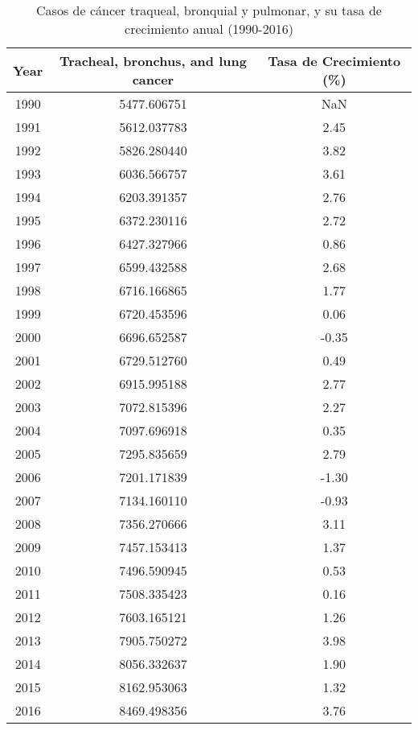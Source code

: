 \begin{table}[ht]
\centering
\begin{tabular}{|c|c|c|}
\hline
\textbf{Year} & \textbf{Tracheal, bronchus, and lung cancer} & \textbf{Tasa de Crecimiento (\%)} \\ \hline
1990 & 5477.606751 & NaN \\ \hline
1991 & 5612.037783 & 2.45 \\ \hline
1992 & 5826.280440 & 3.82 \\ \hline
1993 & 6036.566757 & 3.61 \\ \hline
1994 & 6203.391357 & 2.76 \\ \hline
1995 & 6372.230116 & 2.72 \\ \hline
1996 & 6427.327966 & 0.86 \\ \hline
1997 & 6599.432588 & 2.68 \\ \hline
1998 & 6716.166865 & 1.77 \\ \hline
1999 & 6720.453596 & 0.06 \\ \hline
2000 & 6696.652587 & -0.35 \\ \hline
2001 & 6729.512760 & 0.49 \\ \hline
2002 & 6915.995188 & 2.77 \\ \hline
2003 & 7072.815396 & 2.27 \\ \hline
2004 & 7097.696918 & 0.35 \\ \hline
2005 & 7295.835659 & 2.79 \\ \hline
2006 & 7201.171839 & -1.30 \\ \hline
2007 & 7134.160110 & -0.93 \\ \hline
2008 & 7356.270666 & 3.11 \\ \hline
2009 & 7457.153413 & 1.37 \\ \hline
2010 & 7496.590945 & 0.53 \\ \hline
2011 & 7508.335423 & 0.16 \\ \hline
2012 & 7603.165121 & 1.26 \\ \hline
2013 & 7905.750272 & 3.98 \\ \hline
2014 & 8056.332637 & 1.90 \\ \hline
2015 & 8162.953063 & 1.32 \\ \hline
2016 & 8469.498356 & 3.76 \\ \hline
\end{tabular}
\caption{Casos de cáncer traqueal, bronquial y pulmonar, y su tasa de crecimiento anual (1990-2016)}
\label{table:cancer_growth}
\end{table}

